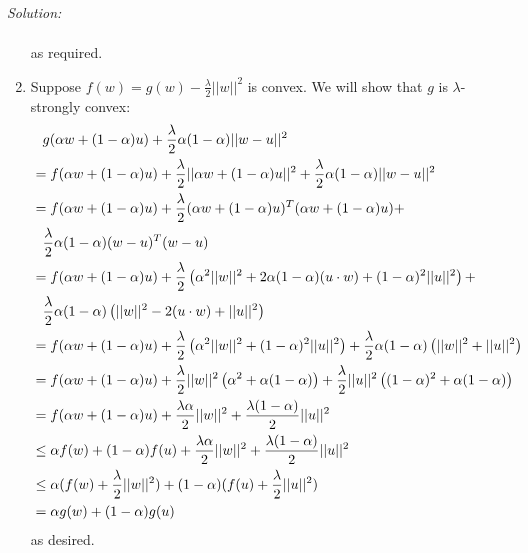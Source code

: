 \documentclass[
10pt, %
a4paper, %
oneside, %
headinclude,footinclude, %
BCOR5mm, %
]{scrartcl}
\newenvironment{solution}
               {\textit{Solution:}}
               {}
\begin{document}
\begin{solution}
\begin{enumerate}[label=(\alph*)]
\begin{align*}
      \end{align*}
        as required.
        \newpage
      \item Suppose $f(w) = g(w) - \frac{\lambda}{2}||w||^2$ is convex. We will show that $g$ is $\lambda$-strongly convex:
        \begin{align*}
          &\hphantom{=} g(\alpha w + (1-\alpha)u) + \frac{\lambda}{2}\alpha(1-\alpha)||w-u||^2 \\
          &= f(\alpha w + (1-\alpha)u) + \frac{\lambda}{2}||\alpha w + (1-\alpha) u||^2 + \frac{\lambda}{2}\alpha(1-\alpha)||w-u||^2 \\
          &= f(\alpha w + (1-\alpha)u) + \frac{\lambda}{2}(\alpha w + (1-\alpha) u)^T(\alpha w + (1-\alpha) u) + \\
          &\hphantom{=} \frac{\lambda}{2}\alpha(1-\alpha)(w-u)^T(w-u) \\
          &= f(\alpha w + (1-\alpha)u) + \frac{\lambda}{2}\left(\alpha^2||w||^2+2\alpha(1-\alpha)(u\cdot w) + (1-\alpha)^2||u||^2\right) + \\
          &\hphantom{=} \frac{\lambda}{2}\alpha(1-\alpha)\left(||w||^2 - 2(u\cdot w) + ||u||^2\right) \\
          &= f(\alpha w + (1-\alpha)u) + \frac{\lambda}{2}\left(\alpha^2||w||^2 + (1-\alpha)^2||u||^2\right) + \frac{\lambda}{2}\alpha(1-\alpha)\left(||w||^2 + ||u||^2\right) \\
          &= f(\alpha w + (1-\alpha)u) + \frac{\lambda}{2}||w||^2\left(\alpha^2 + \alpha(1-\alpha)\right) + \frac{\lambda}{2}||u||^2\left((1-\alpha)^2 + \alpha(1-\alpha)\right) \\
          &= f(\alpha w + (1-\alpha)u) + \frac{\lambda\alpha}{2}||w||^2 + \frac{\lambda(1-\alpha)}{2}||u||^2 \\
          &\leq \alpha f(w) + (1-\alpha)f(u) + \frac{\lambda\alpha}{2}||w||^2 + \frac{\lambda(1-\alpha)}{2}||u||^2 \\
          &\leq \alpha (f(w) + \frac{\lambda}{2}||w||^2) + (1-\alpha)(f(u) + \frac{\lambda}{2}||u||^2) \\
          &= \alpha g(w) + (1-\alpha)g(u)
        \end{align*}
        as desired.


\end{enumerate}
\end{solution}
\end{document}
